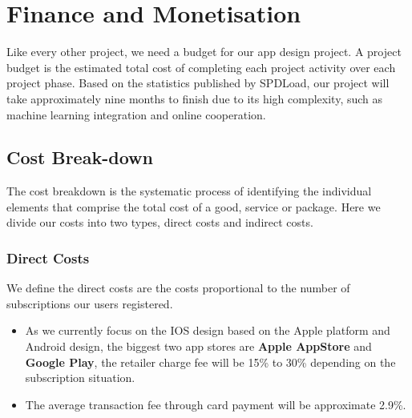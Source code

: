 \section{Finance and Monetisation}
Like every other project, we need a budget for our app design project. A project budget is the estimated total cost of completing each project activity over each project phase. Based on the statistics published by SPDLoad, our project will take approximately nine months to finish due to its high complexity, such as machine learning integration and online cooperation.
\subsection{Cost Break-down}
The cost breakdown is the systematic process of identifying the individual elements that comprise the total cost of a good, service or package. Here we divide our costs into two types, direct costs and indirect costs.
\subsubsection{Direct Costs}
We define the direct costs are the costs proportional to the number of subscriptions our users registered.
\begin{itemize}
\item As we currently focus on the IOS design based on the Apple platform and Android design, the biggest two app stores are \textbf{Apple AppStore} and \textbf{Google Play}, the retailer charge fee will be 15\% to 30\% depending on the subscription situation. \footfullcite{}
\item The average transaction fee through card payment will be approximate 2.9\%.
\end{itemize}



